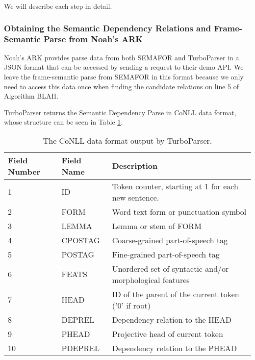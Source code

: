 We will describe each step in detail.

\subsubsection{Obtaining the Semantic Dependency Relations and Frame-Semantic Parse from Noah's ARK}

Noah's ARK provides parse data from both SEMAFOR and TurboParser in a JSON format that can be accessed by sending a request to their demo API. We leave the frame-semantic parse from SEMAFOR in this format because we only need to access this data once when finding the candidate relations on line 5 of Algorithm BLAH.

TurboParser returns the Semantic Dependency Parse in CoNLL data format, whose structure can be seen in Table \ref{tab:CoNLL}.

\begin{table}
\centering
    \begin{tabular}{|l|l|l|}
    \hline
    Field Number & Field Name & Description                                                \\ \hline
    1            & ID         & Token counter, starting at 1 for each new sentence.        \\
    2            & FORM       & Word text form or punctuation symbol                       \\
    3            & LEMMA      & Lemma or stem of FORM                                      \\
    4            & CPOSTAG    & Coarse-grained part-of-speech tag                          \\
    5            & POSTAG     & Fine-grained part-of-speech tag                            \\
    6            & FEATS      & Unordered set of syntactic and/or morphological features   \\
    7            & HEAD       & ID of the parent of the current token ('0' if root)        \\
    8            & DEPREL     & Dependency relation to the HEAD                            \\
    9            & PHEAD      & Projective head of current token                           \\
    10           & PDEPREL    & Dependency relation to the PHEAD                           \\ \hline
    \end{tabular}
\caption{The CoNLL data format output by TurboParser.}
\label{tab:CoNLL}
\end{table}

